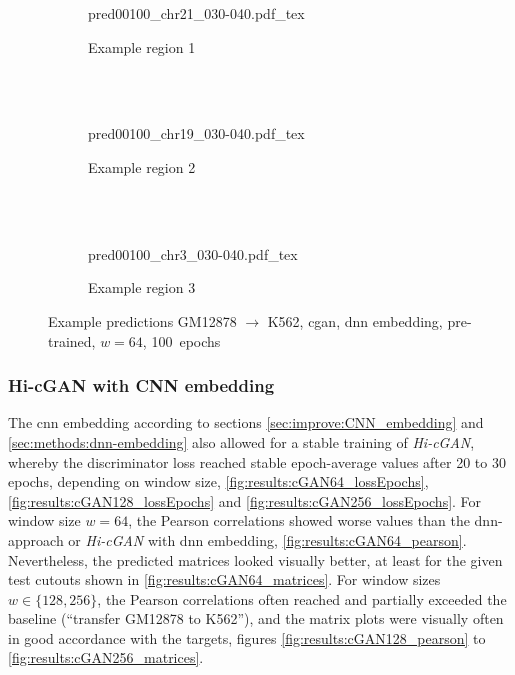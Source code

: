 \begin{figure}[p] %
    \begin{subfigure}{\textwidth}
        \centering
        \scriptsize
        {pred00100_chr21_030-040.pdf_tex}
        \caption{Example  region 1} \label{fig:results:cGAN64_pretrain-dnn_r1}
    \end{subfigure}\\[2mm]
    \\[3mm]
    \begin{subfigure}{\textwidth}
        \centering
        \scriptsize
        {pred00100_chr19_030-040.pdf_tex}
        \caption{Example region 2} \label{fig:results:cGAN64_pretrain-dnn_r2}
    \end{subfigure}\\[2mm]
    \\[3mm]
    \begin{subfigure}{\textwidth}
        \centering
        \scriptsize
        {pred00100_chr3_030-040.pdf_tex}
        \caption{Example region 3} \label{fig:results:cGAN64_pretrain-dnn_r3}
    \end{subfigure}
    \caption{Example predictions GM12878 $\rightarrow$ K562, \acrshort{cgan}, \acrshort{dnn} embedding, pre-trained, $w=64$, 100~epochs} \label{fig:results:cGAN64_pretrain-dnn_matrices}
\end{figure}


\subsubsection{Hi-cGAN with CNN embedding} \label{sec:results:cgan_cnn}
The \acrshort{cnn} embedding according to sections \ref{sec:improve:CNN_embedding} and \ref{sec:methods:dnn-embedding} 
also allowed for a stable training of \emph{Hi-cGAN}, whereby the discriminator loss reached stable epoch-average values after 20 to 30 epochs, 
depending on window size, \cref{fig:results:cGAN64_lossEpochs}, \ref{fig:results:cGAN128_lossEpochs} and \ref{fig:results:cGAN256_lossEpochs}.
For window size $w=64$, the Pearson correlations showed worse values than the \acrshort{dnn}-approach or \emph{Hi-cGAN} with \acrshort{dnn} embedding, \cref{fig:results:cGAN64_pearson}.
Nevertheless, the predicted matrices looked visually better, at least for the given test cutouts shown in \cref{fig:results:cGAN64_matrices}. 
For window sizes $w\in\{128,256\}$, the Pearson correlations often reached and partially exceeded the baseline (``transfer GM12878 to K562''),
and the matrix plots were visually often in good accordance with the targets, figures \ref{fig:results:cGAN128_pearson} to \ref{fig:results:cGAN256_matrices}.

